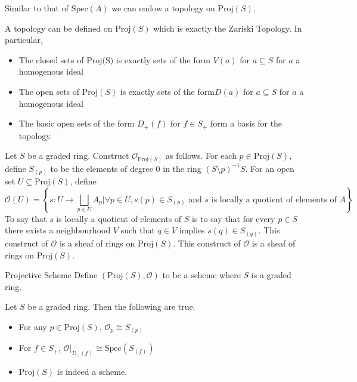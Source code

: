 \documentclass[a4paper]{article}
\begin{document}
Similar to that of $\text{Spec}(A)$ we can endow a topology on $\text{Proj}(S)$. 

\begin{thm}{}{} A topology can be defined on $\text{Proj}(S)$ which is exactly the Zariski Topology. In particular, 
\begin{itemize}
\item The closed sets of $\text{Proj(S)}$ is exactly sets of the form $V(a)$ for $a\subseteq S$ for $a$ a homogenous ideal
\item The open sets of $\text{Proj}(S)$ is exactly sets of the form$ D(a)$ for $a\subseteq S$ for $a$ a homogenous ideal
\item The basic open sets of the form $D_+(f)$ for $f\in S_+$ form a basis for the topology. 
\end{itemize}
\end{thm}

\begin{thm}{}{} Let $S$ be a graded ring. Construct $\mathcal{O}_{\text{Proj}(S)}$ as follows. For each $p\in\text{Proj}(S)$, define $S_{(p)}$ to be the elements of degree $0$ in the ring $(S\setminus p)^{-1}S$. For an open set $U\subseteq\text{Proj}(S)$, define $$\mathcal{O}(U)=\left\{s:U\to\bigsqcup_{p\in U}A_p|\forall p\in U, s(p)\in S_{(p)}\text{ and }s \text{ is locally a quotient of elements of }A\right\}$$ To say that $s$ is locally a quotient of elements of $S$ is to say that for every $p\in S$ there exists a neighbourhood $V$ such that $q\in V$ implies $s(q)\in S_{(q)}$. This construct of $\mathcal{O}$ is a sheaf of rings on $\text{Proj}(S)$. This construct of $\mathcal{O}$ is a sheaf of rings on $\text{Proj}(S)$. 
\end{thm}

\begin{defn}{Projective Scheme}{} Define $(\text{Proj}(S),\mathcal{O})$ to be a scheme where $S$ is a graded ring. 
\end{defn}

\begin{prp}{}{} Let $S$ be a graded ring. Then the following are true. 
\begin{itemize}
\item For any $p\in\text{Proj}(S)$, $\mathcal{O}_{p}\cong S_{(p)}$
\item For $f\in S_+$, $\mathcal{O}|_{D_+(f)}\cong\text{Spec}(S_{(f)})$
\item $\text{Proj}(S)$ is indeed a scheme. 
\end{itemize}
\end{prp}
\end{document}
